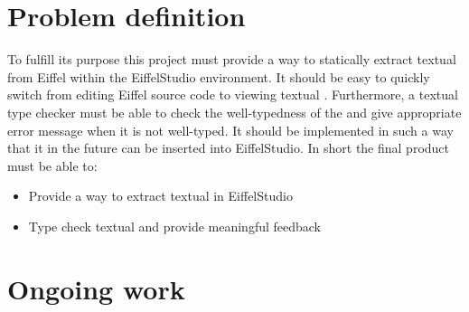 \section{Problem definition}
To fulfill its purpose this project must provide a way to statically extract textual \bon{ } from Eiffel within the EiffelStudio environment. It should be easy to quickly switch from editing Eiffel source code to viewing textual \bon. Furthermore, a textual \bon{ } type checker must be able to check the well-typedness of the \bon{ } and give appropriate error message when it is not well-typed. It should be implemented in such a way that it in the future can be inserted into EiffelStudio. \newline\newline In short the final product must be able to:
\begin{itemize}
 
  \item Provide a way to extract textual \bon{ } in EiffelStudio
  \item Type check textual \bon{ } and provide meaningful feedback
 
\end{itemize}

\section{Ongoing work}